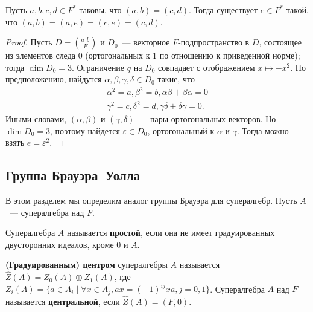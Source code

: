 \documentclass[a4paper,oneside,12pt]{article}
\theoremstyle{plain} { \swapnumbers
\newtheorem{theorem}{Теорема}[subsection]
\newtheorem{corollary}[theorem]{Следствие}
\newtheorem{lemma}[theorem]{Лемма}
\newtheorem{proposition}[theorem]{Утверждение}
\newtheorem{claim}[theorem]{Факт}
}
\theoremstyle{definition} { \swapnumbers
\newtheorem{definition}[theorem]{Определение}
\newtheorem{notation}[theorem]{Обозначение}
\newtheorem{remark}[theorem]{Замечание}
\newtheorem{remarks}[theorem]{Замечания}
\newtheorem{example}[theorem]{Пример}
\newtheorem{examples}[theorem]{Примеры}
\newtheorem{sssection}[theorem]{}
}
\def\quaternion#1#2#3{\binom{{#1}\:\:{#2}}{#3}}
\begin{document}
\begin{lemma}[Альберт]\label{lemma:chain_albert}
Пусть $a,b,c,d\in F^*$ таковы, что $(a,b)=(c,d)$. Тогда существует $e\in F^*$ такой, что $(a,b)=(a,e)=(c,e)=(c,d)$.
\end{lemma}
\begin{proof}
Пусть $D=\quaternion{a}{b}{F}$ и $D_0$~--- векторное $F$-подпространство в $D$, состоящее из элементов следа $0$
(ортогональных к 1 по отношению к приведенной норме); тогда $\dim D_0=3$. Ограничение $q$ на $D_0$ совпадает
с отображением $x\mapsto -x^2$. По предположению, найдутся $\alpha,\beta,\gamma,\delta\in D_0$ такие, что
$$
\begin{array}{c}
\alpha^2=a,\beta^2=b,\alpha\beta+\beta\alpha=0\\
\gamma^2=c,\delta^2=d,\gamma\delta+\delta\gamma=0.
\end{array}
$$
Иными словами, $(\alpha,\beta)$ и $(\gamma,\delta)$~--- пары ортогональных векторов. Но $\dim D_0=3$, поэтому
найдется $\varepsilon\in D_0$, ортогональный к $\alpha$ и $\gamma$. Тогда можно взять $e=\varepsilon^2$.
\end{proof}


\subsection{Группа Брауэра--Уолла}

В этом разделем мы определим аналог группы Брауэра для супералгебр. Пусть $A$~--- супералгебра над $F$.

\begin{definition}
Супералгебра $A$ называется {\bf простой}, если она не имеет градуированных двусторонних идеалов, кроме $0$ и $A$.
\end{definition}
\begin{definition}
{\bf (Градуированным) центром} супералгебры $A$ называется $\hat{Z}(A)=Z_0(A)\oplus Z_1(A)$, где
$Z_i(A)=\{a\in A_i\mid\forall x\in A_j, ax=(-1)^{ij}xa,j=0,1\}$. Супералгебра $A$ над $F$ называется
{\bf центральной}, если $\hat{Z}(A)=(F,0)$.
\end{definition}
\end{document}
